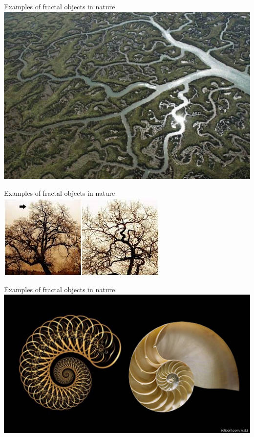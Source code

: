 \documentclass[usenames,dvipsnames,svgnames,10pt,aspectratio=169]{beamer}
\begin{document}
\begin{frame}[t, c]{Examples of fractal objects in nature}{}
	\centering
	\includegraphics[height=.66\textheight]{image_1}

	\vspace{1cm}
\end{frame}

\begin{frame}[t, c]{Examples of fractal objects in nature}{}
	\centering
	\includegraphics[height=.66\textheight]{image_2}

	\vspace{1cm}
\end{frame}

\begin{frame}[t, c]{Examples of fractal objects in nature}{}
	\centering
	\includegraphics[height=.66\textheight]{image_3}

	\vspace{1cm}
\end{frame}
\end{document}
